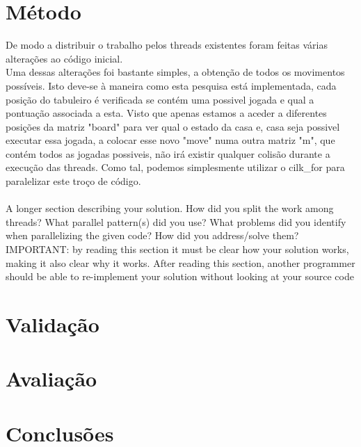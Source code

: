 \documentclass[a4paper]{article}
\begin{document}
\section{Método}
De modo a distribuir o trabalho pelos threads existentes foram feitas várias alterações ao código inicial.\\ 
Uma dessas alterações foi bastante simples, a obtenção de todos os movimentos possíveis. Isto deve-se à maneira como esta pesquisa está implementada, cada posição do tabuleiro é verificada se contém uma possivel jogada e qual a pontuação associada a esta. 
Visto que apenas estamos a aceder a diferentes posições da matriz "board" para ver qual o estado da casa e, casa seja possivel executar essa jogada, a colocar esse novo "move" numa outra matriz "m", que contém todos as jogadas possiveis, não irá existir qualquer colisão durante a execução das threads. Como tal, podemos simplesmente utilizar o cilk\_for para paralelizar este troço de código. 
\\\\ A	longer	section	describing	your	solution.	How	did	you	split	the	work	
among	 threads?	What	parallel	pattern(s)	did	you	use?	 What	problems	did	you	
identify	 when	 parallelizing	 the	 given	 code?	 	 How	 did	 you	 address/solve	 them?	
IMPORTANT:	 by reading	 this	 section	 it	must	 be	 clear	 how	 your	 solution	works,	
making	it	also	clear	why	it	works.	After	reading	this	section,	another	programmer	
should	be	able	to	re-implement	your	solution	without	looking	at	your	source	code

\section{Validação}

\section{Avaliação}

\section{Conclusões}
\end{document}
